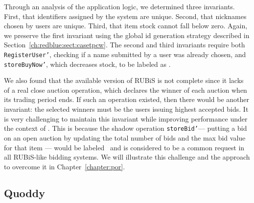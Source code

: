 Through an analysis of the application logic, we determined three invariants.
First, that identifiers assigned by the system are unique.
Second, that nicknames chosen by users are unique. Third, that item stock cannot fall below zero. 
Again, we preserve the first invariant using the global id generation
strategy described in Section~\ref{ch:redblue:sect:casetpcw}. The second and third
invariants require both {\tt RegisterUser'}, checking if a name submitted
by a user was already chosen, and {\tt storeBuyNow'}, which decreases stock, to be
labeled as \red.

We also found that the available version of RUBiS is not complete since it lacks of
a real close auction operation, which declares the winner of each auction when
its trading period ends. If such an operation existed, then there would be
another invariant: the selected winners must be the users issuing highest accepted bids.
It is very challenging to maintain this invariant while improving performance
under the context of \RBCN. This is because the shadow operation {\tt storeBid'}---
putting a bid on an open auction by updating the total number of bids 
and the max bid value for that item --- would be labeled \red\ and is considered to be
a common request in all RUBiS-like bidding systems.
We will illustrate this challenge and the approach to overcome it in Chapter~\ref{chapter:por}.
\subsection{Quoddy}
\label{sect:quoddy}


